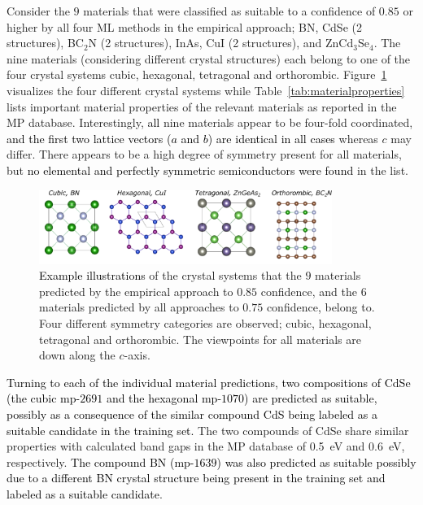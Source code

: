 \documentclass[superscriptaddress,unsortedaddress,
 amsmath,amssymb,
 aps,
]{revtex4-2}
\newcommand{\mrk}[1]{\textcolor{black}{#1}}
\begin{document}
Consider the $9$ materials that were classified as suitable to a confidence of $0.85$ or higher by all four ML methods in the empirical approach; BN, CdSe (2 structures), BC$_2$N (2 structures), InAs, CuI (2 structures), and ZnCd$_3$Se$_4$. 
The nine materials (considering different crystal structures) each belong to one of the four crystal systems cubic, hexagonal, tetragonal and orthorombic. Figure~\ref{fig:crystalsystems} visualizes the four different crystal systems while Table~\ref{tab:materialproperties} lists important material properties of the relevant materials as reported in the MP database.  Interestingly, \mrk{all} nine materials appear to be four-fold coordinated, \mrk{and the first two lattice vectors ($a$ and $b$) are identical in all cases} whereas $c$ may differ.  
There appears to be a high degree of symmetry present for all materials, but \mrk{no elemental and perfectly symmetric semiconductors were found} in the list. 

\begin{figure}[t]
    \centering
    \includegraphics[width=0.85\textwidth]{figure6.png}
    \caption{\mrk{Example illustrations} of the crystal systems that the $9$ materials predicted by the empirical approach to $0.85$ confidence, and the $6$ materials predicted by all approaches to $0.75$ confidence\mrk{,} belong to. Four different symmetry categories are observed; cubic, hexagonal, tetragonal and orthorombic. The viewpoints for all materials are down along the $c$-axis.   }
    \label{fig:crystalsystems}
\end{figure}

\mrk{Turning to each of the individual material predictions, two compositions of CdSe (the cubic mp-$2691$ and the hexagonal mp-$1070$) are predicted as suitable, possibly as a consequence of the similar compound CdS being labeled as a suitable candidate in the training set.}  
The two compounds of CdSe share similar properties with calculated band gaps in the MP database of \SI{0.5}{\electronvolt} and \SI{0.6}{\electronvolt}, respectively. 
\mrk{The compound BN (mp-$1639$) was also predicted as suitable possibly due to a different BN crystal structure being present in the training set and labeled as a suitable candidate}. 
\end{document}
